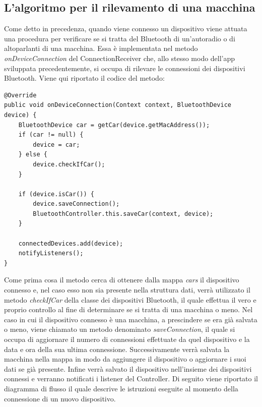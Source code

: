 \subsection{L'algoritmo per il rilevamento di una macchina}\label{ref:rilevamento_macchina}
Come detto in precedenza, quando viene connesso un dispositivo viene attuata una procedura per verificare se si tratta del Bluetooth di un'autoradio o di altoparlanti di una macchina. Essa è implementata nel metodo \textit{onDeviceConnection} del ConnectionReceiver che, allo stesso modo dell'app sviluppata precedentemente, si occupa di rilevare le connessioni dei dispositivi Bluetooth. Viene qui riportato il codice del metodo:
\begin{verbatim}
@Override
public void onDeviceConnection(Context context, BluetoothDevice device) {
    BluetoothDevice car = getCar(device.getMacAddress());
    if (car != null) {
        device = car;
    } else {
        device.checkIfCar();
    }

    if (device.isCar()) {
        device.saveConnection();
        BluetoothController.this.saveCar(context, device);
    }

    connectedDevices.add(device);
    notifyListeners();
}
\end{verbatim}
Come prima cosa il metodo cerca di ottenere dalla mappa \textit{cars} il dispositivo connesso e, nel caso esso non sia presente nella struttura dati, verrà utilizzato il metodo \textit{checkIfCar} della classe dei dispositivi Bluetooth, il quale effettua il vero e proprio controllo al fine di determinare se si tratta di una macchina o meno. Nel caso in cui il dispositivo connesso è una macchina, a prescindere se era già salvata o meno, viene chiamato un metodo denominato \textit{saveConnection}, il quale si occupa di aggiornare il numero di connessioni effettuate da quel dispositivo e la data e ora della sua ultima connessione. Successivamente verrà salvata la macchina nella mappa in modo da aggiungere il dispositivo o aggiornare i suoi dati se già presente. Infine verrà salvato il dispositivo nell'insieme dei dispositivi connessi e verranno notificati i listener del Controller. Di seguito viene riportato il diagramma di flusso il quale descrive le istruzioni eseguite al momento della connessione di un nuovo dispositivo.

